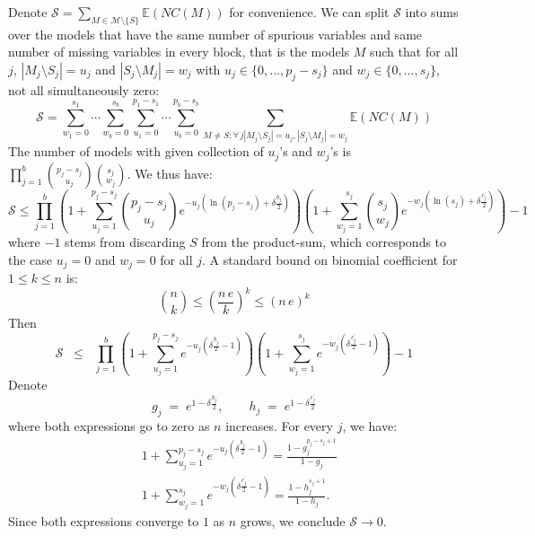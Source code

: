 \documentclass[aos]{imsart}
\theoremstyle{plain}
\newcommand{\E}{\mathbb{E}}
\newcommand{\M}{\mathcal{M}}
\begin{document}
Denote $\mathcal{S}= \sum_{M \in \M\setminus \{S\}} \E\left(NC(M)\right)$ for convenience. We can split $\mathcal{S}$ into sums over the models that have the same number of spurious variables and same number of missing variables in every block, that is the models $M$ such that for all $j$, $|M_j\setminus S_j|=u_j$ and $|S_j\setminus M_j|=w_j$ with $u_j \in \{0,\ldots,p_j-s_j\}$ and $w_j \in \{0,\ldots,s_j\}$, not all simultaneously zero:
$$\mathcal{S} =\sum_{w_1=0}^{s_1}\cdots\sum_{w_b=0}^{s_b}\sum_{u_1=0}^{p_1-s_1}\cdots\sum_{u_b=0}^{p_b-s_b}\sum_{M \neq S:\forall \,j |M_j\setminus S_j|=u_j, |S_j\setminus M_j|=w_j } \E\left(NC(M)\right)$$
The number of models with given collection of $u_j$'s and $w_j$'s is $\prod_{j=1}^b {p_j-s_j \choose u_j}{s_j \choose w_j}$. We thus have:
\begin{equation*}
    \mathcal{S} \leq \prod_{j=1}^b\left(1+\sum_{u_j=1}^{p_j-s_j}{p_j-s_j \choose u_j}e^{- u_j(\ln(p_j-s_j)+\delta \tfrac{b_j}{2})}\right)\left(1+
    \sum_{w_j=1}^{s_j}{s_j \choose w_j}
    e^{-w_j(\ln(s_j)+\delta \tfrac{c^{\prime}_j}{2})}\right) - 1
\end{equation*}
where $-1$ stems from discarding $S$ from the product-sum, which corresponds to the case $u_j=0$ and $w_j=0$ for all $j$. A standard bound on binomial coefficient for $1\leq k\leq n$ is:
\begin{equation*}
    {n \choose k} \leq \left(\frac{n\,e}{k}\right)^k \leq \left(n\,e\right)^k
\end{equation*}
Then
\begin{equation*}
    \mathcal{S} \;\;\leq\;\; \prod_{j=1}^b\left(1+\sum_{u_j=1}^{p_j-s_j}e^{-u_j\left(\delta \tfrac{b_j}{2}-1\right)}\right)\left(1+
    \sum_{w_j=1}^{s_j}    e^{-w_j\left(\delta \tfrac{c^{\prime}_j}{2}-1\right)}\right) - 1
\end{equation*}
Denote
$$
g_j\;=\;e^{1-\delta \tfrac{b_j}{2}},\qquad h_j\;=\;e^{1-\delta \tfrac{c^{\prime}_j}{2}}
$$
where both expressions go to zero as $n$ increases.
For every $j$, we have:
\begin{align*}
    &1+\sum_{u_j=1}^{p_j-s_j}e^{-u_j\left(\delta \tfrac{b_j}{2}-1\right)}
    =\frac{1-g_j^{p_j-s_j+1}}{1-g_j} \\
    &1+\sum_{w_j=1}^{s_j}    e^{-w_j\left(\delta \tfrac{c^{\prime}_j}{2}-1\right)} =\frac{1-h_j^{s_j+1}}{1-h_j}.
\end{align*}
Since both expressions converge to $1$ as $n$ grows, we conclude $\mathcal S\to 0$.
\end{document}
